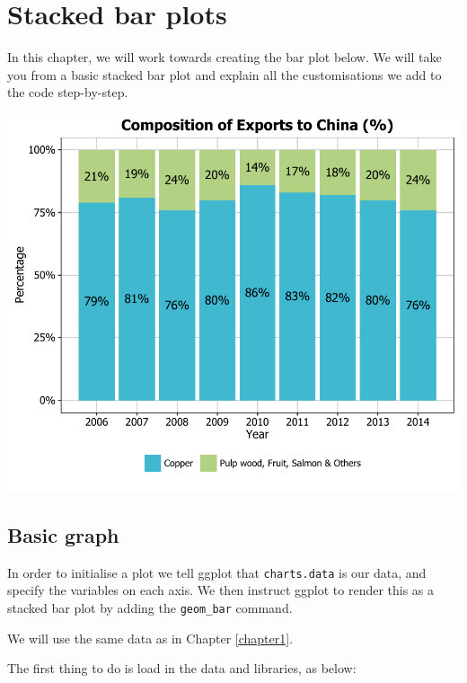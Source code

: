 \chapter{Stacked bar plots}

In this chapter, we will work towards creating the bar plot below. We
will take you from a basic stacked bar plot and explain all the
customisations we add to the code step-by-step.

\begin{center}\includegraphics[width=0.6\linewidth]{4_Stacked_Bar_pdf/stacked_finalresult-1} \end{center}

\section{Basic graph}\label{basic-graph}

In order to initialise a plot we tell ggplot that \texttt{charts.data}
is our data, and specify the variables on each axis. We then instruct
ggplot to render this as a stacked bar plot by adding the
\texttt{geom\_bar} command.

We will use the same data as in Chapter \ref{chapter1}.

The first thing to do is load in the data and libraries, as below:

\begin{Shaded}
\begin{Highlighting}[]

\StringTok{ }\NormalTok{(}\NormalTok{)}
\end{Highlighting}
\end{Shaded}

